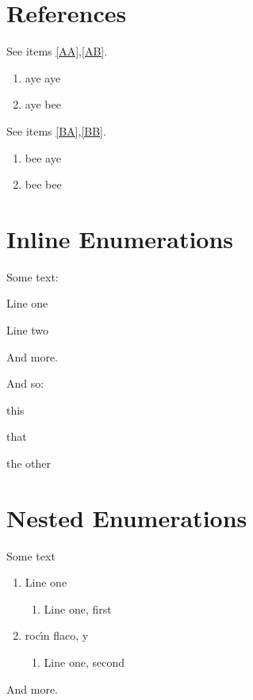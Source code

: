 \documentclass{article}
\begin{document}
\section{References}
See items \ref{AA},\ref{AB}.
\begin{enumerate}[label=\roman*)]
  \item\label{AA} aye aye
  \item\label{AB} aye bee
\end{enumerate}
See items \ref{BA},\ref{BB}.
\begin{enumerate}[label=\roman*),ref=\roman*]
  \item\label{BA} bee aye
  \item\label{BB} bee bee
\end{enumerate}

\section{Inline Enumerations}
Some text:
\begin{enumerate*}[labelindent=\parindent,leftmargin=*]
\item Line one
\item Line two
\end{enumerate*}
And more.

And so:
\begin{enumerate*}[label=\arabic*),itemjoin={{, and then }}, itemjoin*={{, and finally }}] 
\item this \item that \item the other
\end{enumerate*}

\section{Nested Enumerations}
Some text
\begin{enumerate}[label=(\alph*), labelindent=\parindent,
leftmargin=*, start=12]
\item Line one
\begin{enumerate}[label=(\alph{enumi}.\roman*), leftmargin=*, start=7]
\item Line one, first
\end{enumerate}
\item roc\'{\i}n flaco, y
\begin{enumerate}[label=(\alph{enumi}.\roman*), leftmargin=*, resume]
\item Line one, second
\end{enumerate}
\end{enumerate}
And more.
\end{document}
